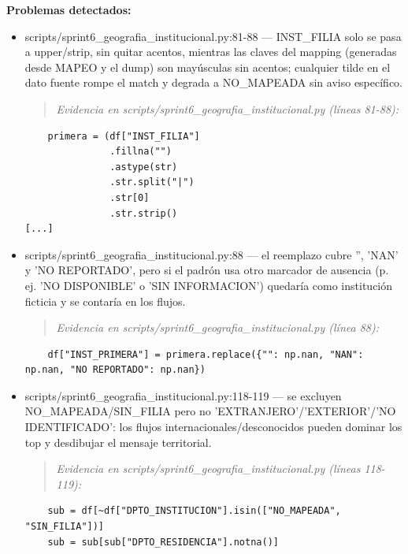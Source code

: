 \begin{tcolorbox}[riesgo]
\textbf{Problemas detectados:}
\begin{itemize}
  \item scripts/sprint6\_geografia\_institucional.py:81-88 --- INST\_FILIA solo se pasa a upper/strip, sin quitar acentos, mientras las claves del mapping (generadas desde MAPEO y el dump) son mayúsculas sin acentos; cualquier tilde en el dato fuente rompe el match y degrada a NO\_MAPEADA sin aviso específico.
\begin{quote}\footnotesize\ttfamily
\noindent\emph{Evidencia en scripts/sprint6\_geografia\_institucional.py (líneas 81-88):}
\end{quote}
\begin{lstlisting}
    primera = (df["INST_FILIA"]
               .fillna("")
               .astype(str)
               .str.split("|")
               .str[0]
               .str.strip()
[...]
\end{lstlisting}

  \item scripts/sprint6\_geografia\_institucional.py:88 --- el reemplazo cubre '', 'NAN' y 'NO REPORTADO', pero si el padrón usa otro marcador de ausencia (p. ej. 'NO DISPONIBLE' o 'SIN INFORMACION') quedaría como institución ficticia y se contaría en los flujos.
\begin{quote}\footnotesize\ttfamily
\noindent\emph{Evidencia en scripts/sprint6\_geografia\_institucional.py (línea 88):}
\end{quote}
\begin{lstlisting}
    df["INST_PRIMERA"] = primera.replace({"": np.nan, "NAN": np.nan, "NO REPORTADO": np.nan})
\end{lstlisting}

  \item scripts/sprint6\_geografia\_institucional.py:118-119 --- se excluyen NO\_MAPEADA/SIN\_FILIA pero no 'EXTRANJERO'/'EXTERIOR'/'NO IDENTIFICADO': los flujos internacionales/desconocidos pueden dominar los top y desdibujar el mensaje territorial.
\begin{quote}\footnotesize\ttfamily
\noindent\emph{Evidencia en scripts/sprint6\_geografia\_institucional.py (líneas 118-119):}
\end{quote}
\begin{lstlisting}
    sub = df[~df["DPTO_INSTITUCION"].isin(["NO_MAPEADA", "SIN_FILIA"])]
    sub = sub[sub["DPTO_RESIDENCIA"].notna()]
\end{lstlisting}


\end{itemize}
\end{tcolorbox}
